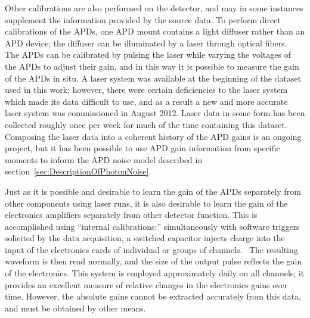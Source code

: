 Other calibrations are also performed on the detector, and may in some instances supplement the information provided by the source data.  To perform direct calibrations of the APDs, one APD mount contains a light diffuser rather than an APD device; the diffuser can be illuminated by a laser through optical fibers.~\cite{detectorPartI}  The APDs can be calibrated by pulsing the laser while varying the voltages of the APDs to adjust their gain, and in this way it is possible to measure the gain of the APDs in situ.  A laser system was available at the beginning of the dataset used in this work; however, there were certain deficiencies to the laser system which made its data difficult to use, and as a result a new and more accurate laser system was commissioned in August 2012.  Laser data in some form has been collected roughly once per week for much of the time containing this dataset.  Composing the laser data into a coherent history of the APD gains is an ongoing project, but it has been possible to use APD gain information from specific moments to inform the APD noise model described in section~\ref{sec:DescriptionOfPhotonNoise}.

Just as it is possible and desirable to learn the gain of the APDs separately from other components using laser runs, it is also desirable to learn the gain of the electronics amplifiers separately from other detector function.  This is accomplished using ``internal calibrations:'' simultaneously with software triggers solicited by the data acquisition, a switched capacitor injects charge into the input of the electronics cards of individual or groups of channels.~\cite{EXOElectronicsFunctionalSpecification}  The resulting waveform is then read normally, and the size of the output pulse reflects the gain of the electronics.  This system is employed approximately daily on all channels; it provides an excellent measure of relative changes in the electronics gains over time.  However, the absolute gains cannot be extracted accurately from this data, and must be obtained by other means.

